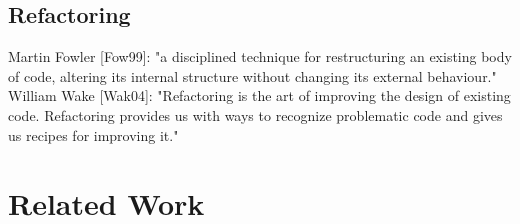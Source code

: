 \subsection{Refactoring}
\label{sec:Refactoring}

\cite{fowler2018refactoring}
Martin Fowler [Fow99]: "a disciplined technique for restructuring an existing body of code, altering its internal structure without changing its external behaviour." William Wake [Wak04]: "Refactoring is the art of improving the design of existing code. Refactoring provides us with ways to recognize problematic code and gives us recipes for improving it."


\section{Related Work}
\label{sec:Template}